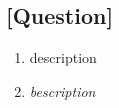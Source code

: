 \documentclass{article}
\newcommand{\bld}{\textbf}
\newcommand{\itl}{\textit}
\newcommand{\bitem}[1]{\item[\bld{#1.}]}
\newcommand{\iitem}[1]{\item[\itl{#1.}]}
\begin{document}
\subsection*{[Question]}
\begin{enumerate}
  \bitem{n} description
  \iitem{n} \itl{bescription}
\end{enumerate}
\end{document}
